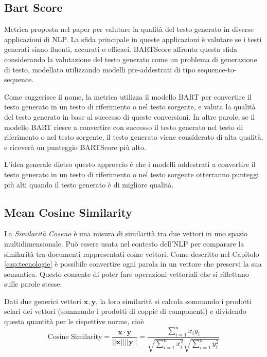 \documentclass[12pt,a4paper,twoside,openright]{book}
\begin{document}
\subsection{Bart Score}
Metrica proposta nel paper \cite{yuan2021bartscore} per valutare la qualità del testo generato in diverse applicazioni di NLP. La sfida principale in queste applicazioni è valutare se i testi generati siano fluenti, accurati o efficaci. BARTScore affronta questa sfida considerando la valutazione del testo generato come un problema di generazione di testo, modellato utilizzando modelli pre-addestrati di tipo sequence-to-sequence.

Come suggerisce il nome, la metrica utilizza il modello BART per convertire il testo generato in un testo di riferimento o nel testo sorgente, e valuta la qualità del testo generato in base al successo di queste conversioni. In altre parole, se il modello BART riesce a convertire con successo il testo generato nel testo di riferimento o nel testo sorgente, il testo generato viene considerato di alta qualità, e riceverà un punteggio BARTScore più alto.

L'idea generale dietro questo approccio è che i modelli addestrati a convertire il testo generato in un testo di riferimento o nel testo sorgente otterranno punteggi più alti quando il testo generato è di migliore qualità.


\subsection{Mean Cosine Similarity}
La \emph{Similarità Coseno} è una misura di similarità tra due vettori in uno spazio multidimensionale. Può essere usata nel contesto dell'NLP per comparare la similarità tra documenti rappresentati come vettori. 
Come descritto nel Capitolo \ref{cap:tecnologie} è possibile convertire ogni parola in un vettore che preservi la sua semantica. Questo consente di poter fare operazioni vettoriali che si riflettano sulle parole stesse. 

Dati due generici vettori $\mathbf{x}, \mathbf{y}$, la loro similarità si calcola sommando i prodotti sclari dei vettori (sommando i prodotti di coppie di componenti) e dividendo questa quantità per le rispettive norme, cioè
\begin{equation}
    \label{eq:cossim}
    \text{Cosine Similarity} = \frac{\mathbf{x \cdot y}}{\vert \vert \mathbf{x} \vert \vert \vert \vert \mathbf{y} \vert \vert} = 
    \frac{\sum_{i=1}^n x_i y_i}{\sqrt{\sum_{i=1}^n x_i^2} \sqrt{\sum_{i=1}^n y_i^2}}
\end{equation}
\end{document}
